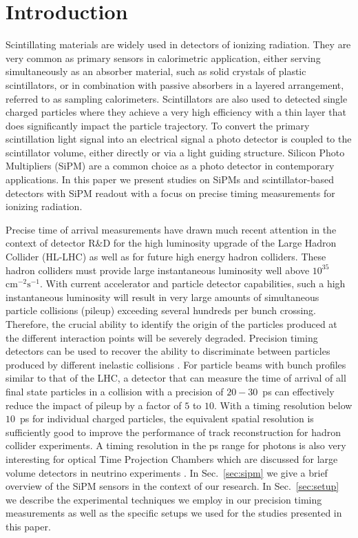 \section{Introduction}
\label{sec:introduction}

Scintillating materials are widely used in detectors of ionizing radiation. 
They are very common as primary sensors in calorimetric application, 
either serving simultaneously as an absorber material, such as solid crystals of plastic scintillators, 
or in combination with passive absorbers in a layered arrangement, 
referred to as sampling calorimeters. Scintillators are also used to detected single charged 
particles where they achieve a very high efficiency with a thin layer 
that does significantly impact the particle trajectory.
To convert the primary scintillation light signal into an electrical signal 
a photo detector is coupled to the scintillator volume, either directly or 
via a light guiding structure. Silicon Photo Multipliers (SiPM) are a common 
choice as a photo detector in contemporary applications. In this paper we present 
studies on SiPMs and scintillator-based detectors with SiPM readout with a focus on 
precise timing measurements for ionizing radiation. 

Precise time of arrival measurements have drawn much recent attention in the 
context of detector R\&D for the high luminosity upgrade of the Large Hadron 
Collider (HL-LHC) as well as for future high energy hadron colliders.  
These hadron colliders must provide large 
instantaneous luminosity well above $10^{35}$~$\mathrm{cm}^{-2}\mathrm{s}^{-1}$.
With current accelerator and particle detector capabilities, such a high 
instantaneous luminosity will result in very large amounts
of simultaneous particle collisions (pileup) exceeding several hundreds per
bunch crossing. Therefore, the crucial ability to identify the origin 
of the particles produced at the different interaction points will be severely 
degraded. Precision timing detectors can be used to recover the ability to 
discriminate between particles produced by different inelastic collisions \cite{adielba}.
For particle beams with bunch profiles similar to that of the LHC, a detector 
that can measure the time of arrival of all final state particles in a collision
with a precision of $20-30$~ps can effectively reduce the impact of
pileup by a factor of $5$ to $10$. 
%
% 
% 
With a timing resolution below $10$~ps for individual charged particles, the
equivalent spatial resolution is sufficiently good to improve the performance of
track reconstruction \cite{4dtracking} for hadron collider experiments. A timing
resolution in the ps range for photons is also very interesting for optical Time
Projection Chambers which are discussed for large volume detectors in neutrino
experiments \cite{lappd, otpc}. 
%
%
%
In Sec.~\ref{sec:sipm} we give a brief overview of the SiPM sensors in the
context of our research. In Sec.~\ref{sec:setup} we describe the experimental
techniques we employ in our precision timing measurements as well as the
specific setups we used for the studies presented in this paper. 

